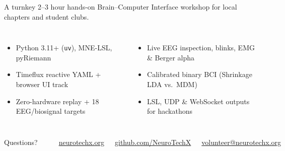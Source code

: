\documentclass[aspectratio=169,11pt,t]{beamer}
\begin{document}
\begin{NTXSandFrame}
  {\NTXSans\small\color{NTXMuted}A turnkey 2--3 hour hands-on Brain--Computer Interface workshop for local chapters and student clubs.\par}
  \vspace{5mm}
  \begin{columns}[T,onlytextwidth]
      \begin{itemize}\small\color{NTXInk}
        \item Python 3.11+ (\texttt{uv}), MNE-LSL, pyRiemann
        \item Timeflux reactive YAML + browser UI track
        \item Zero-hardware replay + 18 EEG/biosignal targets
      \end{itemize}
      \begin{itemize}\small\color{NTXInk}
        \item Live EEG inspection, blinks, EMG \& Berger alpha
        \item Calibrated binary BCI (Shrinkage LDA vs.\ MDM)
        \item LSL, UDP \& WebSocket outputs for hackathons
      \end{itemize}
  \end{columns}
\end{NTXSandFrame}

\begin{NTXDarkFrame}
  \begin{columns}[c,onlytextwidth]
      \NTXBadge[13.5mm]\par\vspace{5mm}
      {\NTXSerif\fontsize{26}{30}\selectfont\color{NTXInk}Questions?\par}
      \vspace{4mm}
      {\color{NTXRuleActive}\rule{18mm}{0.6pt}\par}\vspace{4mm}
      {\NTXSans\small\color{NTXMuted}
        \href{https://neurotechx.org}{neurotechx.org}\par\smallskip
        \href{https://github.com/NeuroTechX}{github.com/NeuroTechX}\par\smallskip
        \href{mailto:volunteer@neurotechx.org}{volunteer@neurotechx.org}\par
      }
      \centering
      {\setlength{\fboxsep}{3mm}\colorbox{white}{\color{black}}}
  \end{columns}
\end{NTXDarkFrame}
\end{document}
